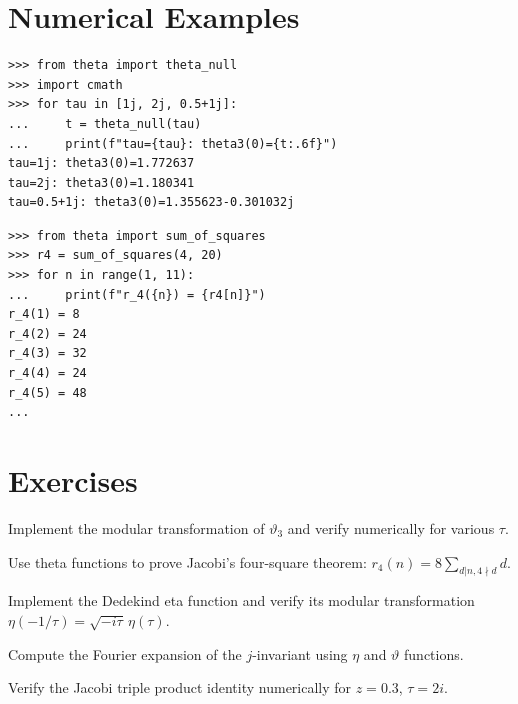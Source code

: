 \section{Numerical Examples}

\begin{example}
\begin{lstlisting}[style=python]
>>> from theta import theta_null
>>> import cmath
>>> for tau in [1j, 2j, 0.5+1j]:
...     t = theta_null(tau)
...     print(f"tau={tau}: theta3(0)={t:.6f}")
tau=1j: theta3(0)=1.772637
tau=2j: theta3(0)=1.180341
tau=0.5+1j: theta3(0)=1.355623-0.301032j
\end{lstlisting}
\end{example}

\begin{example}
\begin{lstlisting}[style=python]
>>> from theta import sum_of_squares
>>> r4 = sum_of_squares(4, 20)
>>> for n in range(1, 11):
...     print(f"r_4({n}) = {r4[n]}")
r_4(1) = 8
r_4(2) = 24
r_4(3) = 32
r_4(4) = 24
r_4(5) = 48
...
\end{lstlisting}
\end{example}

\section{Exercises}

\begin{exercise}
Implement the modular transformation of $\vartheta_3$ and verify numerically for various $\tau$.
\end{exercise}

\begin{exercise}
Use theta functions to prove Jacobi's four-square theorem: $r_4(n) = 8 \sum_{d|n, 4\nmid d} d$.
\end{exercise}

\begin{exercise}
Implement the Dedekind eta function and verify its modular transformation $\eta(-1/\tau) = \sqrt{-i\tau}\, \eta(\tau)$.
\end{exercise}

\begin{exercise}
Compute the Fourier expansion of the $j$-invariant using $\eta$ and $\vartheta$ functions.
\end{exercise}

\begin{exercise}
Verify the Jacobi triple product identity numerically for $z = 0.3$, $\tau = 2i$.
\end{exercise}



